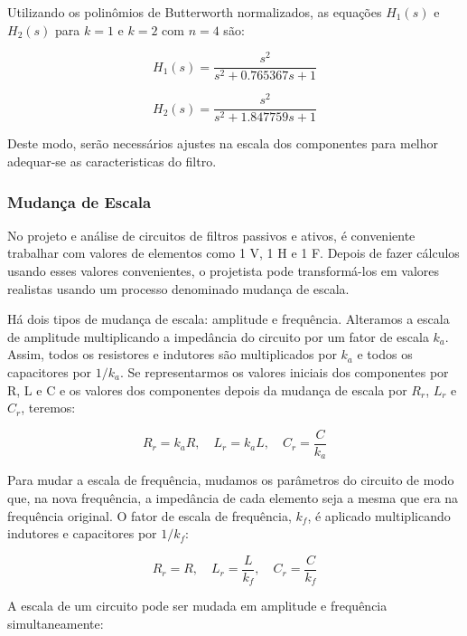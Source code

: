 \documentclass[
	12pt,				%
	openright,			%
	twoside,			%
	a4paper,			%
	english,			%
	french,				%
	spanish,			%
	brazil,				%
	]{abntex2}
\begin{document}
Utilizando os polinômios de Butterworth normalizados, as equações $H_1(s)$ e $H_2(s)$ para $k = 1$ e $k = 2$ com $n = 4$ são:

\begin{equation}
H_1(s) = \frac{s^2}{s^2 + 0.765367s + 1}
\end{equation}

\begin{equation}
H_2(s) = \frac{s^2}{s^2 + 1.847759s + 1}
\end{equation}

Deste modo, serão necessários ajustes na escala dos componentes para melhor adequar-se as caracteristicas do filtro.

\subsubsection*{Mudança de Escala}

No projeto e análise de circuitos de filtros passivos e ativos, é conveniente trabalhar com valores de elementos como 1 V, 1 H e 1 F. Depois de fazer cálculos usando esses valores convenientes, o projetista pode transformá-los em valores realistas usando um processo denominado mudança de escala.

Há dois tipos de mudança de escala: amplitude e frequência. Alteramos a escala de amplitude multiplicando a impedância do circuito por um fator de escala $k_a$. Assim, todos os resistores e indutores são multiplicados por $k_a$ e todos os capacitores por $1/k_a$. Se representarmos os valores iniciais dos componentes por R, L e C e os valores dos componentes depois da mudança de escala por $R_r$, $L_r$ e $C_r$, teremos:

\begin{equation}
R_r = k_a R, \quad L_r = k_a L, \quad C_r = \frac{C}{k_a}
\end{equation}

Para mudar a escala de frequência, mudamos os parâmetros do circuito de modo que, na nova frequência, a impedância de cada elemento seja a mesma que era na frequência original. O fator de escala de frequência, $k_f$, é aplicado multiplicando indutores e capacitores por $1/k_f$:

\begin{equation}
R_r = R, \quad L_r = \frac{L}{k_f}, \quad C_r = \frac{C}{k_f}
\end{equation}

A escala de um circuito pode ser mudada em amplitude e frequência simultaneamente:
\end{document}
